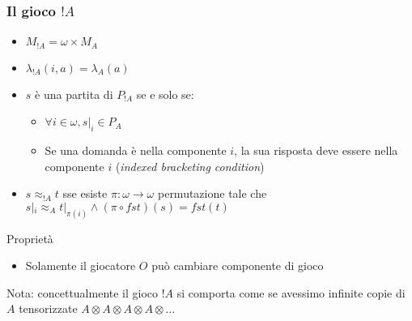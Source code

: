 \documentclass{beamer}
\begin{document}
\begin{frame}
	
	\frametitle{Il gioco $!A$}
	
	\begin{itemize}
		\item $M_{!A}=\omega \times M_A$
		\item $\lambda_{!A}(i,a)=\lambda_A(a)$
		\item $s$ è una partita di $P_{!A}$ se e solo se:
		\begin{itemize}
			\item $\forall i\in \omega , s|_i \in P_A$
			\item Se una domanda è nella componente $i$, la sua risposta deve essere nella componente $i$ (\emph{indexed bracketing condition})
		\end{itemize}

		\item $s\approx_{!A} t$ sse esiste $\pi:\omega \rightarrow \omega$ permutazione tale che $s|_i \approx_A t|_{\pi(i)} \wedge (\pi \circ fst)(s)=fst(t)$
	\end{itemize}
	
	\begin{block}{Proprietà}
		\begin{itemize}
			\item Solamente il giocatore $O$ può cambiare componente di gioco
		\end{itemize}
	\end{block}
	
	Nota: concettualmente il gioco $!A$ si comporta come se avessimo infinite copie di $A$ tensorizzate $A\otimes A\otimes A\otimes A\otimes \dots$
	
\end{frame}
\end{document}
